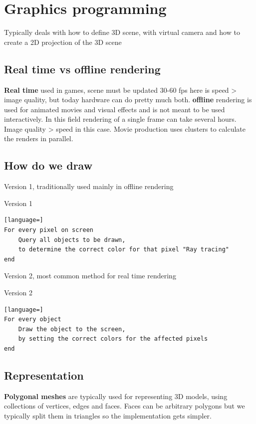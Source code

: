 \section{Graphics programming}
Typically deals with how to define 3D scene, with virtual camera and how to create a 2D projection of the 3D scene

\subsection*{Real time vs offline rendering}
\textbf{Real time} used in games, scene must be updated 30-60 fps here is speed > image quality, but today hardware can do pretty much both. \textbf{offline} rendering is used for animated movies and visual effects and is not meant to be used interactively. In this field rendering of a single frame can take several hours. Image quality > speed in this case. Movie production uses clusters to calculate the renders in parallel.

\subsection*{How do we draw}
Version 1, traditionally used mainly in offline rendering

\begin{example}{Version 1}
\begin{lstlisting}[language=]
For every pixel on screen
	Query all objects to be drawn,
	to determine the correct color for that pixel "Ray tracing"
end
\end{lstlisting}
\end{example}

Version 2, most common method for real time rendering
\begin{example}{Version 2}
\begin{lstlisting}[language=]
For every object
	Draw the object to the screen,
	by setting the correct colors for the affected pixels
end
\end{lstlisting}
\end{example}


\subsection*{Representation}
\textbf{Polygonal meshes} are typically used for representing 3D models, using collections of vertices, edges and faces. Faces can be arbitrary polygons but we typically split them in triangles so the implementation gets simpler. 

